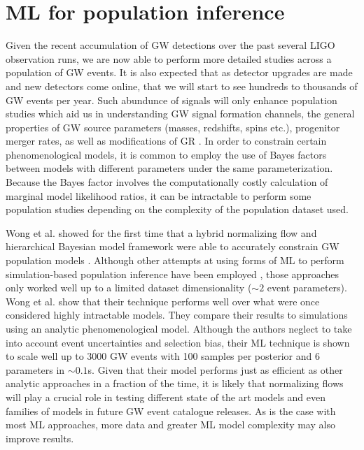 \section{ML for population inference}

%
%
Given the recent accumulation of \ac{GW} detections over the 
past several \ac{LIGO} observation runs, we are now able to 
perform more detailed studies across a population of \ac{GW} events. 
It is also expected that as detector upgrades are made and new detectors 
come online, that we will start to see hundreds to thousands of 
\ac{GW} events per year.
Such abundunce of signals will only enhance population studies which 
aid us in understanding \ac{GW} 
signal formation channels, the general properties of \ac{GW} 
source parameters  (masses, redshifts, spins etc.), progenitor merger 
rates, as well as modifications of \ac{GR} \cite{Abbott_2019}. In 
order to constrain certain phenomenological models, it is common to 
employ the use of Bayes factors between models with different parameters 
under the same parameterization. Because the Bayes factor involves 
the computationally costly calculation of marginal model likelihood 
ratios, it can be intractable to perform some population studies 
depending on the complexity of the population dataset used. %

%
%
Wong et al. showed for the first time that a hybrid normalizing flow 
and hierarchical Bayesian model framework were able to accurately 
constrain \ac{GW} population models \cite{PhysRevD.100.083015}.
Although other attempts at using forms of \ac{ML} to perform simulation-based 
population inference have been employed \cite{PhysRevD.98.083017, PhysRevD.100.083015}, those approaches only worked well up 
to a limited dataset dimensionality ($\sim2$ event parameters). Wong et al. show 
that their technique performs well 
over what were once considered highly intractable models. They compare their 
results to simulations using an analytic phenomenological model. Although 
the authors neglect to take into account event uncertainties and 
selection bias, their \ac{ML} technique is shown to scale well up to 3000 \ac{GW} events 
with 100 samples per posterior and 6 parameters in $\sim0.1$s. Given that their model 
performs just as efficient as other analytic approaches in a fraction of 
the time, it is likely that normalizing flows will play a crucial 
role in testing different state of the art models and even families 
of models in future \ac{GW} event catalogue releases. As is the case with most 
\ac{ML} approaches, more data and greater \ac{ML} model complexity may 
also improve results.


